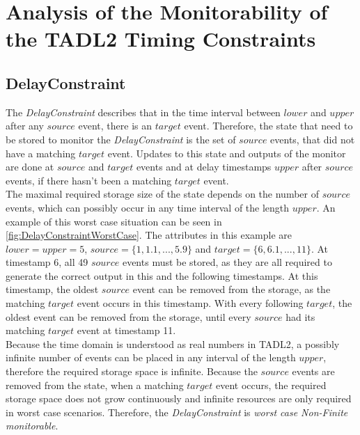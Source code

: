 \chapter{Analysis of the Monitorability of the TADL2 Timing Constraints}
\label{chapter-TADL2}

\section{DelayConstraint}
	\label{monitorability_DelayConstraint}
	The \emph{DelayConstraint} describes that in the time interval between $lower$ and $upper$ after any $source$ event, there is an $target$ event. Therefore, the state that need to be stored to monitor the \emph{DelayConstraint} is the set of $source$ events, that did not have a matching $target$ event. Updates to this state and outputs of the monitor are done at $source$ and $target$ events and at delay timestamps $upper$ after $source$ events, if there hasn't been a matching $target$ event.\\
	The maximal required storage size of the state depends on the number of $source$ events, which can possibly occur in any time interval of the length $upper$. An example of this worst case situation can be seen in \ref{fig:DelayConstraintWorstCase}. The attributes in this example are $lower=upper=5$, $source=\{1, 1.1, ..., 5.9\}$ and $target=\{6, 6.1, ..., 11\}$. At timestamp 6, all 49 $source$ events must be stored, as they are all required to generate the correct output in this and the following timestamps. At this timestamp, the oldest $source$ event can be removed from the storage, as the matching $target$ event occurs in this timestamp. With every following $target$, the oldest event can be removed from the storage, until every $source$ had its matching $target$ event at timestamp 11.\\
	Because the time domain is understood as real numbers in TADL2, a possibly infinite number of events can be placed in any interval of the length $upper$, therefore the required storage space is infinite. Because the $source$ events are removed from the state, when a matching $target$ event occurs, the required storage space does not grow continuously and infinite resources are only required in worst case scenarios. Therefore, the \emph{DelayConstraint} is \emph{worst case Non-Finite monitorable}.
